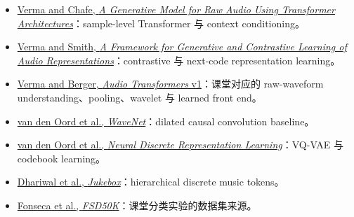 \begin{itemize}
  \item \href{https://arxiv.org/abs/2106.16036}{Verma and Chafe, \emph{A Generative Model for Raw Audio Using Transformer Architectures}}：sample-level Transformer 与 context conditioning。
  \item \href{https://arxiv.org/abs/2010.11459}{Verma and Smith, \emph{A Framework for Generative and Contrastive Learning of Audio Representations}}：contrastive 与 next-code representation learning。
  \item \href{https://arxiv.org/abs/2105.00335v1}{Verma and Berger, \emph{Audio Transformers} v1}：课堂对应的 raw-waveform understanding、pooling、wavelet 与 learned front end。
  \item \href{https://arxiv.org/abs/1609.03499}{van den Oord et al., \emph{WaveNet}}：dilated causal convolution baseline。
  \item \href{https://arxiv.org/abs/1711.00937}{van den Oord et al., \emph{Neural Discrete Representation Learning}}：VQ-VAE 与 codebook learning。
  \item \href{https://arxiv.org/abs/2005.00341}{Dhariwal et al., \emph{Jukebox}}：hierarchical discrete music tokens。
  \item \href{https://arxiv.org/abs/2010.00475}{Fonseca et al., \emph{FSD50K}}：课堂分类实验的数据集来源。
\end{itemize}


